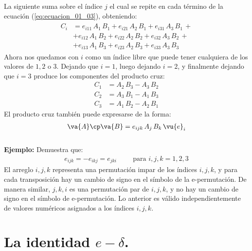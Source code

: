 La siguiente suma sobre el índice $j$ el cual se repite en cada término de la ecuación (\ref{eq:ecuacion_01_03}), obteniendo:
\begin{align}
\begin{aligned}
C_{i} & = e_{i11} \, A_{1} \, B_{1} + e_{i21} \, A_{2} \, B_{1} + e_{i31} \, A_{3} \, B_{1} \, + \\[0.5em]
& + e_{i12} \, A_{1} \, B_{2} + e_{i22} \, A_{2} \, B_{2} + e_{i32} \, A_{3} \, B_{2} \, + \\[0.5em]
& + e_{i13} \, A_{1} \, B_{3} + e_{i23} \, A_{2} \, B_{3} + e_{i33} \, A_{3} \, B_{3}
\end{aligned}
\label{eq:ecuacion_01_04}
\end{align}
Ahora nos quedamos con $i$ como un índice libre que puede tener cualquiera de los valores de $1, 2$ o $3$. Dejando que $i = 1$, luego dejando $i = 2$, y finalmente dejando que $i = 3$ produce los componentes del producto cruz:
\begin{align*}
C_{1} & = A_{2} \, B_{3} - A_{3} \, B_{2} \\[0.5em]
C_{2} & = A_{3} \, B_{1} - A_{1} \, B_{3} \\[0.5em]
C_{3} & = A_{1} \, B_{2} - A_{2} \, B_{1}
\end{align*}
El producto cruz también puede expresarse de la forma:
\begin{align*}
\va{A} \cp \va{B} = e_{ijk} \, A_{j} \, B_{k} \, \vu{e}_{i}
\end{align*}
\\[0.5em]
\noindent
\textbf{Ejemplo: } Demuestra que:
\begin{align*}
e_{ijk} = - e_{ikj} = e_{jki} \hspace{1cm} \text{para } i, j, k = 1, 2, 3
\end{align*}
El arreglo $i, j, k$ representa una permutación impar de los índices $i, j, k$, y para cada transposición hay un cambio de signo en el símbolo de la e-permutación. De manera similar, $j, k, i$ es una permutación par de $i, j, k$, y no hay un cambio de signo en el símbolo de e-permutación. Lo anterior es válido independientemente de valores numéricos asignados a los índices $i, j, k$.

\section{La identidad \texorpdfstring{$e-\delta$}{e-d}.}

